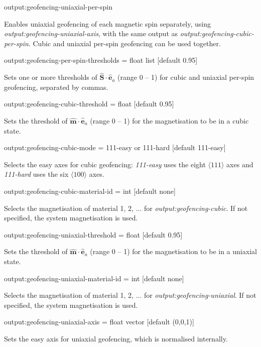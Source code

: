 {\zicf output:geofencing-uniaxial-per-spin} Enables uniaxial geofencing of each magnetic spin separately, using \textit{output:geofencing-uniaxial-axis}, with the same output as \textit{output:geofencing-cubic-per-spin}. Cubic and uniaxial per-spin geofencing can be used together.

{\zicf output:geofencing-per-spin-thresholds = float list [default 0.95]} Sets one or more thresholds of $\hat{\mathbf{S}}\cdot\hat{\mathbf{e}}_a$ (range 0 -- 1) for cubic and uniaxial per-spin geofencing, separated by commas.

{\zicf output:geofencing-cubic-threshold = float [default 0.95]} Sets the threshold of $\hat{\mathbf{m}}\cdot\hat{\mathbf{e}}_a$ (range 0 -- 1) for the magnetisation to be in a cubic state.

{\zicf output:geofencing-cubic-mode = 111-easy or 111-hard [default 111-easy]} Selects the easy axes for cubic geofencing: \textit{111-easy} uses the eight $\langle 111 \rangle$ axes and \textit{111-hard} uses the six $\langle 100 \rangle$ axes.

{\zicf output:geofencing-cubic-material-id = int [default none]} Selects the magnetisation of material 1, 2, ... for \textit{output:geofencing-cubic}. If not specified, the system magnetisation is used.

{\zicf output:geofencing-uniaxial-threshold = float [default 0.95]} Sets the threshold of $\hat{\mathbf{m}}\cdot\hat{\mathbf{e}}_a$ (range 0 -- 1) for the magnetisation to be in a uniaxial state.

{\zicf output:geofencing-uniaxial-material-id = int [default none]} Selects the magnetisation of material 1, 2, ... for \textit{output:geofencing-uniaxial}. If not specified, the system magnetisation is used.

{\zicf output:geofencing-uniaxial-axis = float vector [default (0,0,1)]} Sets the easy axis for uniaxial geofencing, which is normalised internally.


